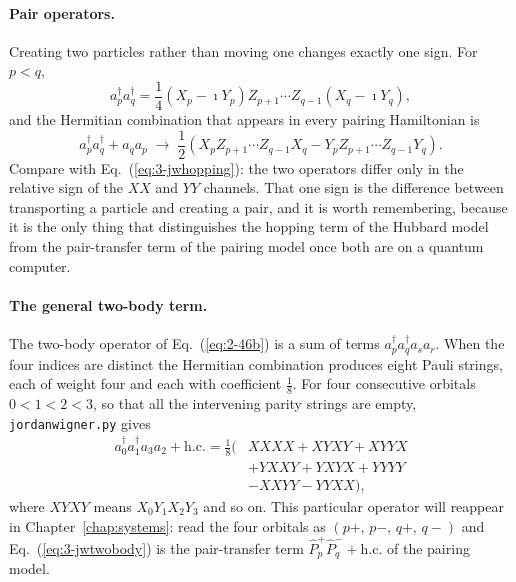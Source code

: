 \paragraph{Pair operators.}
Creating two particles rather than moving one changes exactly one sign.  For
$p<q$,
\begin{equation}
  a_p^{\dagger}a_q^{\dagger}
   = \frac14\left(X_p-\imath Y_p\right)
     Z_{p+1}\cdots Z_{q-1}
     \left(X_q-\imath Y_q\right),
  \label{eq:3-jwpaircreate}
\end{equation}
and the Hermitian combination that appears in every pairing Hamiltonian is
\begin{equation}
  a_p^{\dagger}a_q^{\dagger} + a_qa_p
   \;\longrightarrow\;
   \frac12\left(
     X_pZ_{p+1}\cdots Z_{q-1}X_q
     - Y_pZ_{p+1}\cdots Z_{q-1}Y_q
   \right).
  \label{eq:3-jwpairtransfer}
\end{equation}
Compare with Eq.~(\ref{eq:3-jwhopping}): the two operators differ only in the
relative sign of the $XX$ and $YY$ channels.  That one sign is the difference
between transporting a particle and creating a pair, and it is worth
remembering, because it is the only thing that distinguishes the hopping term
of the Hubbard model from the pair-transfer term of the pairing model once
both are on a quantum computer.

\paragraph{The general two-body term.}
The two-body operator of Eq.~(\ref{eq:2-46b}) is a sum of terms
$a_p^{\dagger}a_q^{\dagger}a_sa_r$.  When the four indices are distinct the
Hermitian combination produces eight Pauli strings, each of weight four and
each with coefficient $\tfrac18$.  For four consecutive orbitals
$0<1<2<3$, so that all the intervening parity strings are empty,
\texttt{jordanwigner.py} gives
\begin{align}
  a_0^{\dagger}a_1^{\dagger}a_3a_2 + \mathrm{h.c.}
   = \frac18\Big(
     &XXXX + XYXY + XYYX \nonumber\\
     &+ YXXY + YXYX + YYYY \nonumber\\
     &- XXYY - YYXX
   \Big),
  \label{eq:3-jwtwobody}
\end{align}
where $XYXY$ means $X_0Y_1X_2Y_3$ and so on.  This particular operator will
reappear in Chapter~\ref{chap:systems}: read the four orbitals as
$(p+,\,p-,\,q+,\,q-)$ and Eq.~(\ref{eq:3-jwtwobody}) is the pair-transfer
term $\hat{P}^{+}_p\hat{P}^{-}_q+\mathrm{h.c.}$ of the pairing model.

